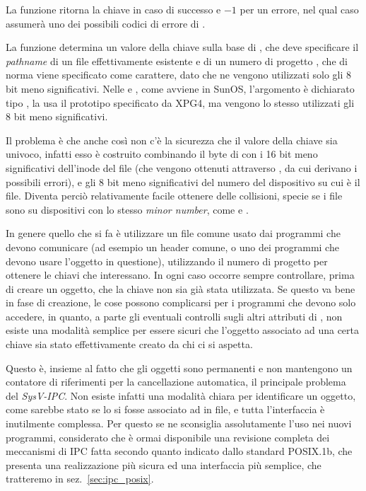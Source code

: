 \begin{funcproto}{
}

{La funzione ritorna la chiave in caso di successo e $-1$ per un errore, nel
  qual caso  assumerà uno dei possibili codici di errore di
  .}
\end{funcproto}

La funzione determina un valore della chiave sulla base di ,
che deve specificare il \textit{pathname} di un file effettivamente esistente
e di un numero di progetto , che di norma viene specificato
come carattere, dato che ne vengono utilizzati solo gli 8 bit meno
significativi. Nelle  e , come avviene in SunOS,
l'argomento  è dichiarato tipo , la  usa
il prototipo specificato da XPG4, ma vengono lo stesso utilizzati gli 8 bit
meno significativi.

Il problema è che anche così non c'è la sicurezza che il valore della chiave
sia univoco, infatti esso è costruito combinando il byte di 
con i 16 bit meno significativi dell'inode del file  (che
vengono ottenuti attraverso , da cui derivano i possibili errori),
e gli 8 bit meno significativi del numero del dispositivo su cui è il file.
Diventa perciò relativamente facile ottenere delle collisioni, specie se i
file sono su dispositivi con lo stesso \textit{minor number}, come
 e .

In genere quello che si fa è utilizzare un file comune usato dai programmi che
devono comunicare (ad esempio un header comune, o uno dei programmi che devono
usare l'oggetto in questione), utilizzando il numero di progetto per ottenere
le chiavi che interessano. In ogni caso occorre sempre controllare, prima di
creare un oggetto, che la chiave non sia già stata utilizzata. Se questo va
bene in fase di creazione, le cose possono complicarsi per i programmi che
devono solo accedere, in quanto, a parte gli eventuali controlli sugli altri
attributi di , non esiste una modalità semplice per essere
sicuri che l'oggetto associato ad una certa chiave sia stato effettivamente
creato da chi ci si aspetta.

Questo è, insieme al fatto che gli oggetti sono permanenti e non mantengono un
contatore di riferimenti per la cancellazione automatica, il principale
problema del \textit{SysV-IPC}. Non esiste infatti una modalità chiara per
identificare un oggetto, come sarebbe stato se lo si fosse associato ad in
file, e tutta l'interfaccia è inutilmente complessa.  Per questo se ne
sconsiglia assolutamente l'uso nei nuovi programmi, considerato che è ormai
disponibile una revisione completa dei meccanismi di IPC fatta secondo quanto
indicato dallo standard POSIX.1b, che presenta una realizzazione più sicura ed
una interfaccia più semplice, che tratteremo in sez.~\ref{sec:ipc_posix}.


